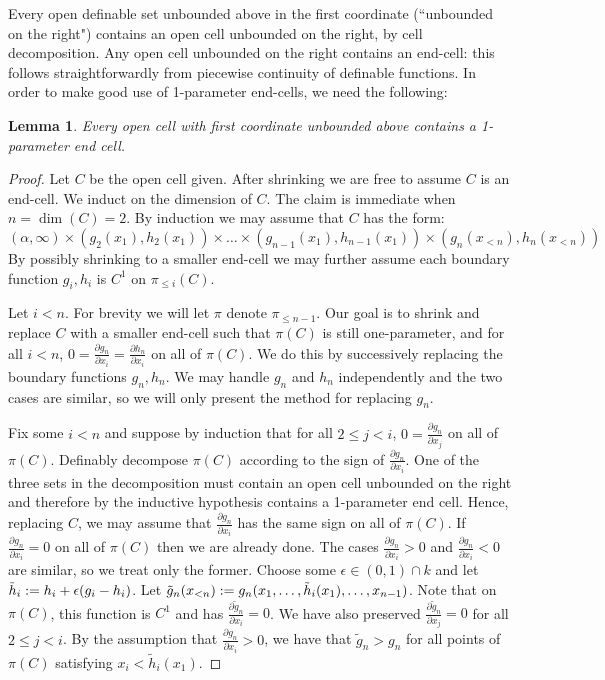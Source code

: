 \documentclass{article}
\newtheorem{lemma}[theorem]{Lemma}
\theoremstyle{remark}
\theoremstyle{definition}
\theoremstyle{definition}
\theoremstyle{definition}
\theoremstyle{definition}
\begin{document}
Every open definable set unbounded above in the first coordinate (``unbounded on the right") contains an open cell unbounded on the right, by cell decomposition. Any open cell unbounded on the right contains an end-cell: this follows straightforwardly from piecewise continuity of definable functions. In order to make good use of 1-parameter end-cells, we need the following:
\begin{lemma}\label{ParamLemma}
Every open cell with first coordinate unbounded above contains a 1-parameter end cell.
\end{lemma}
\begin{proof}
    Let $C$ be the open cell given. After shrinking we are free to assume $C$ is an end-cell. We induct on the dimension of $C$. The claim is immediate when $n=\dim(C)=2$. By induction we may assume that $C$ has the form:
    \[(\alpha,\infty)\times (g_2(x_1),h_2(x_1))\times\dots\times(g_{n-1}(x_1), h_{n-1}(x_1))\times (g_n(x_{<n}), h_n(x_{<n}))\]
    By possibly shrinking to a smaller end-cell we may further assume each boundary function $g_i,h_i$ is $C^1$ on $\pi_{\leq i}(C)$.
    
    Let $i<n$. For brevity we will let $\pi$ denote $\pi_{\leq n-1}$. Our goal is to shrink and replace $C$ with a smaller end-cell such that $\pi(C)$ is still one-parameter, and for all $i<n$,  $0=\frac{\partial g_n}{\partial x_i}=\frac{\partial h_n}{\partial x_i}$ on all of $\pi(C)$. We do this by successively replacing the boundary functions $g_n,h_n$. We may handle $g_n$ and $h_n$ independently and the two cases are similar, so we will only present the method for replacing $g_n$.
    
    Fix some $i<n$ and suppose by induction that for all $2\leq j<i$, $0=\frac{\partial g_n}{\partial x_j}$ on all of $\pi(C)$. Definably decompose $\pi(C)$ according to the sign of $\frac{\partial g_n}{\partial x_i}$. One of the three sets in the decomposition must contain an open cell unbounded on the right and therefore by the inductive hypothesis contains a 1-parameter end cell. Hence, replacing $C$, we may assume that $\frac{\partial g_n}{\partial x_i}$ has the same sign on all of $\pi(C)$. If $\frac{\partial g_n}{\partial x_i}=0$ on all of $\pi(C)$ then we are already done. The cases $\frac{\partial g_n}{\partial x_i}>0$ and $\frac{\partial g_n}{\partial x_i}<0$ are similar, so we treat only the former. Choose some $\epsilon \in (0,1)\cap k$ and let $\Tilde{h}_i:=h_i+\epsilon(g_i-h_i)$. Let $\Tilde{g}_n(x_{<n}):=g_n(x_1,\dots,\tilde{h}_i(x_1),\dots,x_{n-1})$. Note that on $\pi(C)$, this function is $C^1$ and has $\frac{\partial \tilde{g}_n}{\partial x_i}=0$. We have also preserved $\frac{\partial \tilde{g}_n}{\partial x_j}=0$ for all $2\leq j<i$. By the assumption that $\frac{\partial g_n}{\partial x_i}>0$, we have that $\tilde{g}_n>g_n$ for all points of $\pi(C)$ satisfying $x_i<\tilde{h}_i(x_{1})$. 


\end{proof}
\end{document}
